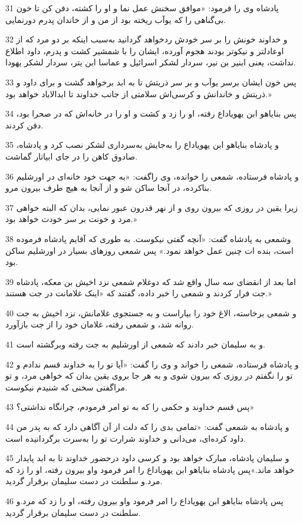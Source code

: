 \par 31 پادشاه وی را فرمود: «موافق سخنش عمل نما و او را کشته، دفن کن تا خون بی‌گناهی را که یوآب ریخته بود از من و از خاندان پدرم دورنمایی.
\par 32 و خداوند خونش را بر سر خودش ردخواهد گردانید به‌سبب اینکه بر دو مرد که از اوعادلتر و نیکوتر بودند هجوم آورده، ایشان را با شمشیر کشت و پدرم، داود اطلاع نداشت، یعنی ابنیر بن نیر، سردار لشکر اسرائیل و عماسا ابن یتر، سردار لشکر یهودا.
\par 33 پس خون ایشان برسر یوآب و بر سر ذریتش تا به ابد برخواهد گشت و برای داود و ذریتش و خاندانش و کرسی‌اش سلامتی از جانب خداوند تا ابدالاباد خواهد بود.»
\par 34 پس بنایاهو ابن یهویاداع رفته، او را زد و کشت و او را در خانه‌اش که در صحرا بود، دفن کردند.
\par 35 و پادشاه بنایاهو ابن یهویاداع را به‌جایش به‌سرداری لشکر نصب کرد و پادشاه، صادوق کاهن را در جای ابیاتار گماشت.
\par 36 و پادشاه فرستاده، شمعی را خوانده، وی راگفت: «به جهت خود خانه‌ای در اورشلیم بناکرده، در آنجا ساکن شو و از آنجا به هیچ طرف بیرون مرو.
\par 37 زیرا یقین در روزی که بیرون روی و از نهر قدرون عبور نمایی، بدان که البته خواهی مرد و خونت بر سر خودت خواهد بود.»
\par 38 وشمعی به پادشاه گفت: «آنچه گفتی نیکوست. به طوری که آقایم پادشاه فرموده است، بنده ات چنین عمل خواهد نمود.» پس شمعی روزهای بسیار در اورشلیم ساکن بود.
\par 39 اما بعد از انقضای سه سال واقع شد که دوغلام شمعی نزد اخیش بن معکه، پادشاه جت فرار کردند و شمعی را خبر داده، گفتند که «اینک غلامانت در جت هستند.»
\par 40 و شمعی برخاسته، الاغ خود را بیاراست و به جستجوی غلامانش، نزد اخیش به جت روانه شد، و شمعی رفته، غلامان خود را از جت بازآورد.
\par 41 و به سلیمان خبر دادند که شمعی از اورشلیم به جت رفته وبرگشته است.
\par 42 و پادشاه فرستاده، شمعی را خواند و وی را گفت: «آیا تو را به خداوند قسم ندادم و تو را نگفتم در روزی که بیرون شوی و به هر جا بروی یقین بدان که خواهی مرد، و تو مراگفتی سخنی که شنیدم نیکوست.
\par 43 پس قسم خداوند و حکمی را که به تو امر فرمودم، چرانگاه نداشتی؟»
\par 44 و پادشاه به شمعی گفت: «تمامی بدی را که دلت از آن آگاهی دارد که به پدر من داود کرده‌ای، می‌دانی و خداوند شرارت تو را به‌سرت برگردانیده است.
\par 45 و سلیمان پادشاه، مبارک خواهد بود و کرسی داود درحضور خداوند تا به ابد پایدار خواهد ماند.»پس پادشاه بنایاهو ابن یهویاداع را امر فرمود واو بیرون رفته، او را زد که مرد.و سلطنت در دست سلیمان برقرار گردید.
\par 46 پس پادشاه بنایاهو ابن یهویاداع را امر فرمود واو بیرون رفته، او را زد که مرد.و سلطنت در دست سلیمان برقرار گردید.
 

